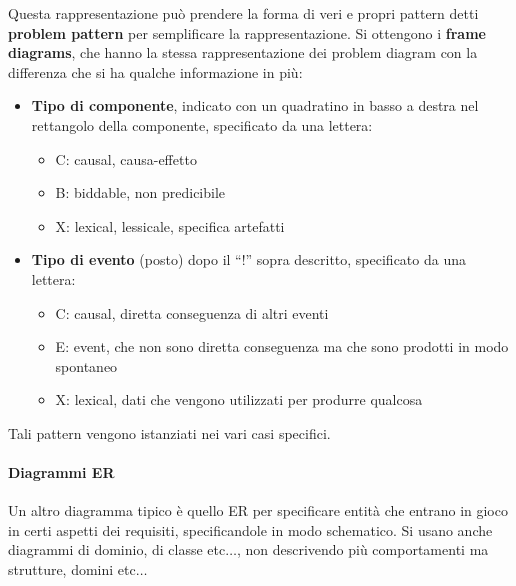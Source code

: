 Questa rappresentazione può prendere la forma di veri e propri pattern detti
\textbf{problem pattern} per semplificare la rappresentazione. Si ottengono i
\textbf{frame diagrams}, che hanno la stessa rappresentazione dei problem diagram
con la differenza che si ha qualche informazione in più:
\begin{itemize}
    \item \textbf{Tipo di componente}, indicato con un quadratino in basso a
          destra nel rettangolo della componente, specificato da una lettera:
          \begin{itemize}
              \item C: causal, causa-effetto
              \item B: biddable, non predicibile
              \item X: lexical, lessicale, specifica artefatti
          \end{itemize}
    \item \textbf{Tipo di evento} (posto) dopo il “!” sopra descritto, specificato
          da una lettera:
          \begin{itemize}
              \item C: causal, diretta conseguenza di altri eventi
              \item E: event, che non sono diretta conseguenza ma che sono prodotti
                    in modo spontaneo
              \item X: lexical, dati che vengono utilizzati per produrre qualcosa
          \end{itemize}
\end{itemize}
Tali pattern vengono istanziati nei vari casi specifici.
\paragraph{Diagrammi ER}
Un altro diagramma tipico è quello ER per specificare entità che entrano in gioco
in certi aspetti dei requisiti, specificandole in modo schematico. Si usano anche
diagrammi di dominio, di classe etc$\dots$, non descrivendo più comportamenti
ma strutture, domini etc$\dots$
